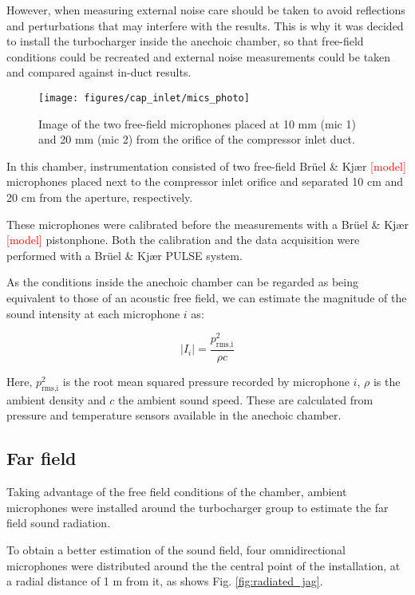 However, when measuring external noise care should be taken to avoid reflections and perturbations that may interfere with the results. This is why it was decided to install the turbocharger inside the anechoic chamber, so that free-field conditions could be recreated and external noise measurements could be taken and compared against in-duct results.

\begin{wrapfigure}[20]{r}[1.5cm]{0.4\textwidth}
\centering
\vspace{-3mm}
\texttt{[image: figures/cap\_inlet/mics\_photo]}
\caption{Image of the two free-field microphones placed at 10 mm (mic 1) and 20 mm (mic 2) from the orifice of the compressor inlet duct.}
\label{fig:mics_photo}
\end{wrapfigure}

In this chamber, instrumentation consisted of two free-field Brüel \& Kjær \textcolor{red}{[model]} microphones placed next to the compressor inlet orifice and separated 10 cm and 20 cm from the aperture, respectively. 

These microphones were calibrated before the measurements with a Brüel \& Kjær \textcolor{red}{[model]} pistonphone. Both the calibration and the data acquisition were performed with a Brüel \& Kjær PULSE system.

As the conditions inside the anechoic chamber can be regarded as being equivalent to those of an acoustic free field, we can estimate the magnitude of the sound intensity at each microphone $i$ as:

\begin{equation}
	|I_i| = \frac{p^2_\text{rms,i}}{\rho c}
\end{equation}

Here, $p^2_\text{rms,i}$ is the root mean squared pressure recorded by microphone $i$, $\rho$ is the ambient density and $c$ the ambient sound speed. These are calculated from pressure and temperature sensors available in the anechoic chamber.

\subsection{Far field}
\label{sub:metod_far_field}

Taking advantage of the free field conditions of the chamber, ambient microphones were installed around the turbocharger group to estimate the far field sound radiation.

To obtain a better estimation of the sound field, four omnidirectional microphones were distributed around the the central point of the installation, at a radial distance of 1 m from it, as shows Fig. \ref{fig:radiated_jag}.

